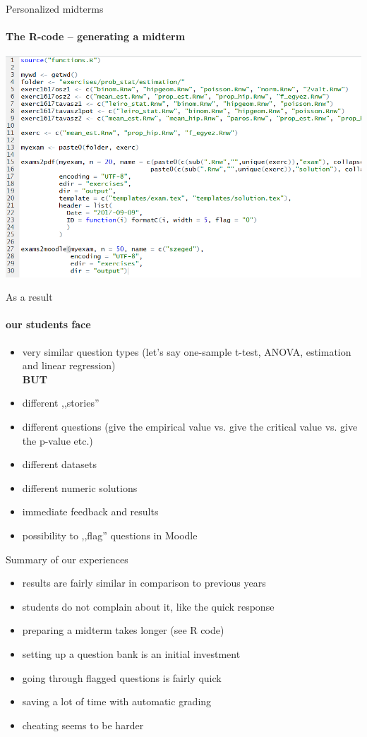 \documentclass[10pt]{beamer}
\begin{document}
\begin{frame}{Personalized midterms}
\framesubtitle{The R-code -- generating a midterm}
\begin{center}
\includegraphics[width = \textwidth]{graph/R3.png}
\end{center}
\end{frame}

\begin{frame}{As a result}
\framesubtitle{our students face}
\begin{itemize}
\item very similar question types (let's say one-sample t-test, ANOVA, estimation and linear regression) \\ \textbf{BUT}
\item different ,,stories''
\item different questions (give the empirical value vs. give the critical value vs. give the p-value etc.)
\item different datasets
\item different numeric solutions
\item immediate feedback and results
\item possibility to ,,flag'' questions in Moodle
\end{itemize}
\end{frame}

\begin{frame}{Summary of our experiences}
\begin{itemize}
\item results are fairly similar in comparison to previous years
\item students do not complain about it, like the quick response
\item preparing a midterm takes longer (see R code)
\item setting up a question bank is an initial investment
\item going through flagged questions is fairly quick
\item saving a lot of time with automatic grading
\item cheating seems to be harder
\end{itemize}
\end{frame}
\end{document}
